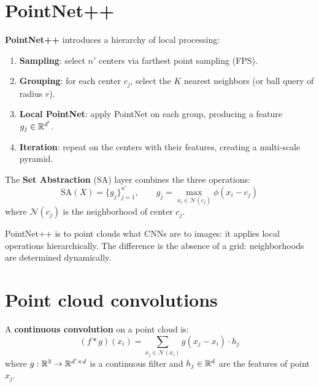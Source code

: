 \section{PointNet++}
\label{sec:pointnetpp}

\begin{definition}
\textbf{PointNet++} introduces a hierarchy of local processing:
\begin{enumerate}
  \item \textbf{Sampling}: select $n'$ centers via farthest point
        sampling (FPS).
  \item \textbf{Grouping}: for each center $c_j$, select the $K$
        nearest neighbors (or ball query of radius $r$).
  \item \textbf{Local PointNet}: apply PointNet on each group,
        producing a feature $g_j \in \mathbb{R}^{d'}$.
  \item \textbf{Iteration}: repeat on the centers with their
        features, creating a multi-scale pyramid.
\end{enumerate}
\end{definition}

\begin{definition}
The \textbf{Set Abstraction} (SA) layer combines the three
operations:
\[
  \mathrm{SA}(X) = \{g_j\}_{j=1}^{n'}, \qquad
  g_j = \max_{x_i \in \mathcal{N}(c_j)} \phi(x_i - c_j)
\]
where $\mathcal{N}(c_j)$ is the neighborhood of center $c_j$.
\end{definition}

\begin{intuition}
PointNet++ is to point clouds what CNNs are to images: it applies
local operations hierarchically. The difference is the absence of
a grid: neighborhoods are determined dynamically.
\end{intuition}

\section{Point cloud convolutions}
\label{sec:convolutions}

\begin{definition}
A \textbf{continuous convolution} on a point cloud is:
\[
  (f * g)(x_i) = \sum_{x_j \in \mathcal{N}(x_i)}
  g(x_j - x_i) \cdot h_j
\]
where $g : \mathbb{R}^3 \to \mathbb{R}^{d' \times d}$ is a continuous filter
and $h_j \in \mathbb{R}^d$ are the features of point $x_j$.
\end{definition}

